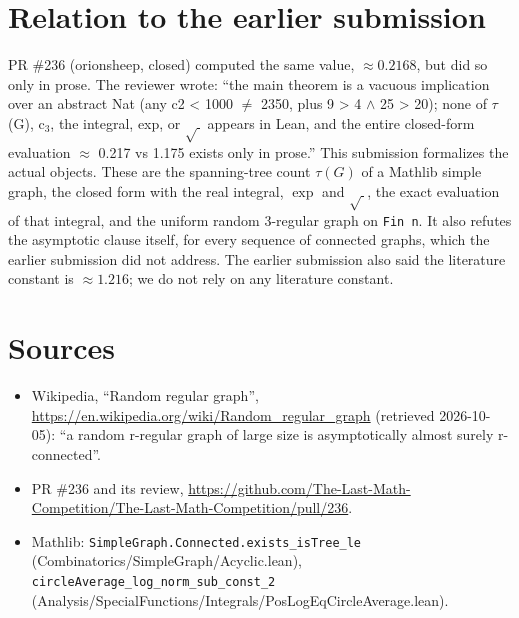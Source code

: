 \documentclass[11pt]{article}
\theoremstyle{definition}
\begin{document}
\section{Relation to the earlier submission}

PR \#236 (orionsheep, closed) computed the same value, $\approx0.2168$, but did so only in prose.
The reviewer wrote: ``the main theorem is a vacuous implication over an abstract Nat (any c2 < 1000
$\neq$ 2350, plus 9 > 4 $\wedge$ 25 > 20); none of $\tau$(G), c$_3$, the integral, exp, or
$\sqrt{\ }$ appears in Lean, and the entire closed-form evaluation $\approx$ 0.217 vs 1.175 exists
only in prose.'' This submission formalizes the actual objects. These are the spanning-tree count
$\tau(G)$ of a Mathlib simple graph, the closed form with the real integral, $\exp$ and
$\sqrt{\ }$, the exact evaluation of that integral, and the uniform random 3-regular graph on
\texttt{Fin n}. It also refutes the asymptotic clause itself, for every sequence of connected
graphs, which the earlier submission did not address. The earlier submission also said the
literature constant is $\approx1.216$; we do not rely on any literature constant.

\section*{Sources}
\begin{itemize}
\item Wikipedia, ``Random regular graph'', \url{https://en.wikipedia.org/wiki/Random_regular_graph}
  (retrieved 2026-10-05): ``a random r-regular graph of large size is asymptotically almost surely
  r-connected''.
\item PR \#236 and its review,
  \url{https://github.com/The-Last-Math-Competition/The-Last-Math-Competition/pull/236}.
\item Mathlib: \texttt{SimpleGraph.Connected.exists\_isTree\_le}
  (Combinatorics/SimpleGraph/Acyclic.lean), \texttt{circleAverage\_log\_norm\_sub\_const\_2}
  (Analysis/SpecialFunctions/Integrals/PosLogEqCircleAverage.lean).
\end{itemize}
\end{document}
